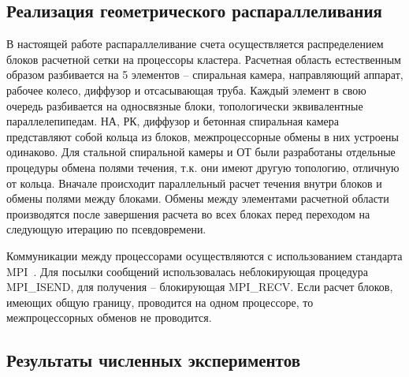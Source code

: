 \subsection{Реализация геометрического распараллеливания}
\label{s:162}
В настоящей работе распараллеливание счета осуществляется распределением блоков расчетной сетки на процессоры 
кластера. Расчетная область естественным образом разбивается на 5 элементов -- спиральная камера, 
направляющий аппарат, рабочее колесо, диффузор и отсасывающая труба. Каждый элемент в свою очередь 
разбивается на односвязные блоки, топологически эквивалентные параллелепипедам. НА, РК, диффузор и бетонная 
спиральная камера представляют собой кольца из блоков, межпроцессорные обмены в них устроены одинаково. 
Для стальной спиральной камеры и ОТ были разработаны отдельные процедуры обмена полями течения, т.к. они 
имеют другую топологию, отличную от кольца. Вначале происходит параллельный расчет течения внутри блоков и 
обмены полями между блоками. Обмены между элементами расчетной области производятся после завершения расчета 
во всех блоках перед переходом на следующую итерацию по псевдовремени.

Коммуникации между процессорами осуществляются с использованием стандарта MPI~\cite{MPI}. 
Для посылки сообщений использовалась неблокирующая процедура MPI\_ISEND, для 
получения -- блокирующая MPI\_RECV. 
Если расчет блоков, имеющих общую границу, проводится на одном процессоре, то межпроцессорных обменов не 
проводится.

\subsection{Результаты численных экспериментов}
\label{s:163}
